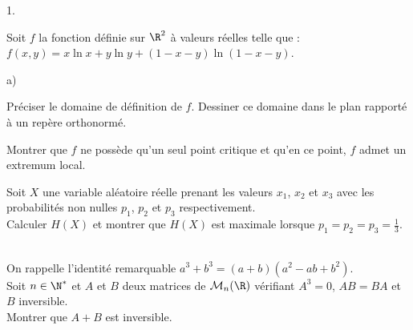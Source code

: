 \documentclass[11pt]{article}%
\begin{document}
\begin{exerciceAP}
\begin{noliste}{1.}
  \item Soit $f$ la fonction définie sur $\R^2$ à valeurs réelles
    telle que : $f(x,y) = x \ln x + y \ln y + (1-x-y) \ln
    (1-x-y)$. 
    \begin{noliste}{a)}
    \setlength{\itemsep}{2mm}
    \item Préciser le domaine de définition de $f$. Dessiner ce
      domaine dans le plan rapporté à un repère orthonormé.
    \item Montrer que $f$ ne possède qu'un seul point critique et
      qu'en ce point, $f$ admet un extremum local.
    \item Soit $X$ une variable aléatoire réelle prenant les valeurs
      $x_1$, $x_2$ et $x_3$ avec les probabilités non nulles $p_1$,
      $p_2$ et $p_3$ respectivement.\\

      Calculer $H(X)$ et montrer que $H(X)$ est maximale lorsque
      $p_1=p_2=p_3 = \frac{1}{3}$.
    \end{noliste}   
  \end{noliste}
\end{exerciceAP}


\begin{exerciceSP}~\\
  On rappelle l'identité remarquable $a^3 + b^3 = (a+b) (a^2 - a b +
  b^2)$.\\
  Soit $n \in \N^*$ et $A$ et $B$ deux matrices de $\mathcal{M}_n ( \R
  )$ vérifiant $A^3 = 0$, $A B = B A$ et $B$ inversible. \\
  Montrer que $A + B$ est inversible.
\end{exerciceSP}


\newpage
\end{document}
